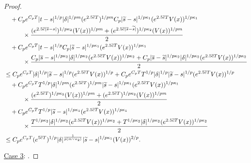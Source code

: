 \documentclass[11pt]{article}
\theoremstyle{theorem}
\theoremstyle{definition}
\newcommand{\1}{{\bf 1}}
\begin{document}
\begin{proof}
\begin{align}
& \quad + C_p e^{C_p T} |t-s|^{1/p} |\delta|^{1/pm} (e^{2.5\overline{c}T})^{1/pm}  C_p |\widetilde{s}-s|^{1/p\kappa_1} (e^{2.5\overline{c}T}V(x))^{1/p\kappa_1}    \notag\\
& \qquad \quad \times \dfrac{  (e^{2.5\overline{c}|\overline{s}-s|})^{1/p\kappa_2} (V(x))^{1/pm} +(e^{2.5\overline{c}|\overline{s}-\widetilde{s}|})^{1/p\kappa_2} (V(x))^{1/pm} }{2}\notag\\
& \quad + C_p e^{C_p T} |t-s|^{1/p}   C_p |\widetilde{s}-s|^{1/p\kappa_1} (e^{2.5\overline{c}T}V(x))^{1/p\kappa_1} \notag\\ 
  &\qquad \quad \times  \dfrac{ C_p |\overline{s}-s|^{1/p\kappa_2} |\delta|^{1/p\kappa_2} (e^{2.5\overline{c}T}V(x))^{1/p\kappa_2} + C_p|\overline{s}-\widetilde{s}|^{1/p\kappa_2} |\delta|^{1/p\kappa_2} (e^{2.5\overline{c}T}V(x))^{1/p\kappa_2}}{2}    \notag\\
  & \leq  C_p e^{C_p T}   |\delta|^{1/p} |\widetilde{s} -s|^{1/p} (e^{2.5\overline{c}T}V(x))^{1/p}  + C_p e^{C_p T}   T^{1/p} |\delta|^{1/p}  |\widetilde{s}-s|^{1/p} (e^{2.5\overline{c}T}V(x))^{1/p}  \notag\\
& \quad + C_p e^{C_p T} T^{1/p} |\delta|^{1/pm} (e^{2.5\overline{c}T})^{1/pm}   |\widetilde{s}-s|^{1/p\kappa_1} (e^{2.5\overline{c}T}V(x))^{1/p\kappa_1}    \notag\\
& \qquad \quad \times \dfrac{  (e^{2.5\overline{c}T})^{1/p\kappa_2} (V(x))^{1/pm} +(e^{2.5\overline{c}T})^{1/p\kappa_2} (V(x))^{1/pm} }{2}\notag\\
& \quad + C_p e^{C_p T} T^{1/p}  |\widetilde{s}-s|^{1/p\kappa_1} (e^{2.5\overline{c}T}V(x))^{1/p\kappa_1} \notag\\ 
  &\qquad \quad \times  \dfrac{  T^{1/p\kappa_2} |\delta|^{1/p\kappa_2} (e^{2.5\overline{c}T}V(x))^{1/p\kappa_2} +  T^{1/p\kappa_2} |\delta|^{1/p\kappa_2} (e^{2.5\overline{c}T}V(x))^{1/p\kappa_2}}{2}    \notag\\
  & \leq C_p e^{C_p T}  (e^{5\overline{c}T})^{1/p} |\delta|^{\frac{1}{p(m \vee \kappa_2)}} |\widetilde{s}-s|^{1/p\kappa_1}  (V(x))^{2/p}.
  \label{vi2}
\end{align}

\noindent\underline{Case 3}: .


\end{proof}
\end{document}
